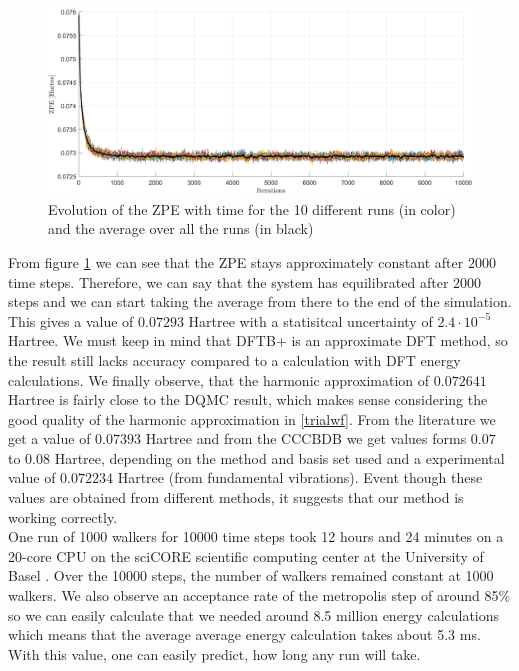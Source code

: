 \documentclass [12pt]{report}
\begin{document}
\begin{figure}[h!]
\includegraphics[width=\linewidth] {c2h6_1.png}
\caption{Evolution of the ZPE with time for the 10 different runs (in color) and the average over all the runs (in black)} \label{c2h6_1}
\end{figure}
From figure \ref{c2h6_1} we can see that the ZPE stays approximately constant after $2000$ time steps. Therefore, we can say that the system has equilibrated after $2000$ steps and we can start taking the average from there to the end of the simulation. This gives a value of $0.07293$ Hartree with a statisitcal uncertainty  of $2.4 \cdot 10^{-5}$ Hartree. We must keep in mind that DFTB+ is an approximate DFT method, so the result still lacks accuracy compared to a calculation with DFT energy calculations. We finally observe, that the harmonic approximation of $0.072641$ Hartree is fairly close to the DQMC result, which makes sense considering the good quality of the harmonic approximation in \ref{trialwf}. From the literature \cite{c2h6} we get a value of $0.07393$ Hartree and from the CCCBDB \cite{cccbdb} we get values forms $0.07$ to $0.08$ Hartree, depending on the method and basis set used and a experimental value of $0.072234$ Hartree (from fundamental vibrations). Event though these values are obtained from different methods, it suggests that our method is working correctly.\\
One run of 1000 walkers for 10000 time steps took 12 hours and 24 minutes on a 20-core CPU on the sciCORE scientific computing center at the University of Basel \cite{http://scicore.unibas.ch/}. Over the 10000 steps, the number of walkers remained constant at 1000 walkers.  We also observe an acceptance rate of the metropolis step of around 85\% so we can easily calculate that we needed around 8.5 million energy calculations which means that the average average energy calculation takes about 5.3 ms. With this value, one can easily predict, how long any run will take. 
\end{document}
